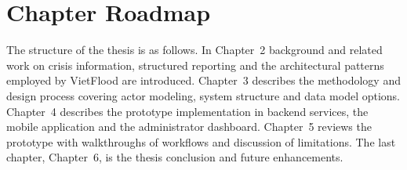\section{Chapter Roadmap}

The structure of the thesis is as follows. In Chapter~2 background and related work on crisis information, structured reporting and the architectural patterns employed by VietFlood are introduced. Chapter~3 describes the methodology and design process covering actor modeling, system structure and data model options. Chapter~4 describes the prototype implementation in backend services, the mobile application and the administrator dashboard. Chapter~5 reviews the prototype with walkthroughs of workflows and discussion of limitations. The last chapter, Chapter~6, is the thesis conclusion and future enhancements.
